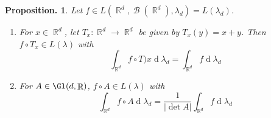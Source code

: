 \documentclass[11pt, a4paper]{memoir}
\DeclareMathOperator{\R}{{\mathbb{R}}}
\theoremstyle{change}
\newtheorem{proposition}[theorem]{Proposition.}
\theoremstyle{plain}
\theoremstyle{nonumberplain}
\DeclareMathOperator{\B}{{\mathcal{B}}}
\renewcommand{\d}[1]{\ensuremath{\operatorname{d}\!{#1}}}
\numberwithin{equation}{section}
\begin{document}
\begin{proposition}
    Let $f\in L(\R^d,\B(\R^d),\lambda_d)=L(\lambda_d)$.
    \begin{enumerate}[nolistsep,label=(\roman*)]
        \item For $x\in\R^d$, let $T_x:\R^d\to\R^d$ be given by $T_x(y)=x+y$.
            Then $f\circ T_x\in L(\lambda)$ with
            \begin{equation*}
                \int_{\R^d}f\circ T)x\d{\lambda_d}=\int_{\R^d}f\d{\lambda_d}
            \end{equation*}
        \item For $A\in\Gl(d,\R)$, $f\circ A\in L(\lambda)$ with
            \begin{equation*}
                \int_{\R^d}f\circ A\d{\lambda_d}=\frac{1}{|\det A|}\int_{\R^d}f\d{\lambda_d}
            \end{equation*}
    \end{enumerate}
\end{proposition}
\end{document}
